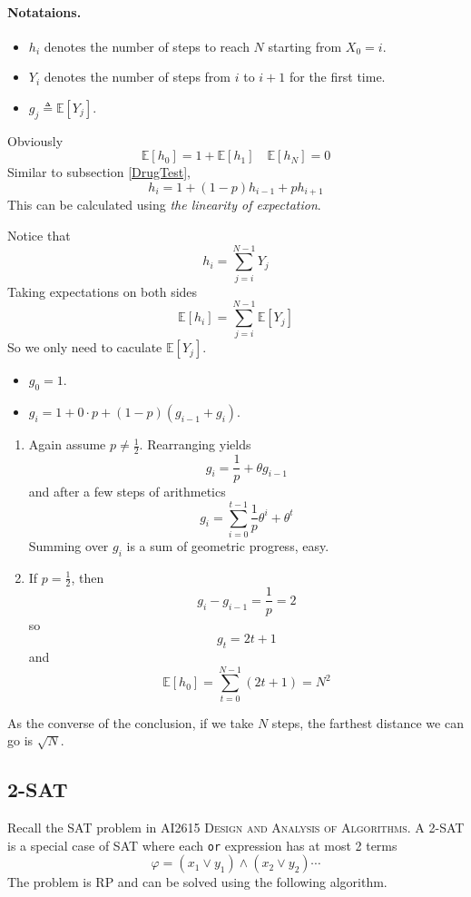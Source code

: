 \paragraph*{Notataions.}
\begin{itemize}
    \item $h_i$ denotes the number of steps to reach $N$ starting from $X_0=i$.
    \item $Y_i$ denotes the number of steps from $i$ to $i+1$ for the first time.
    \item $g_j \triangleq \mathbb{E}[Y_j]$.
\end{itemize}
Obviously
\[ \mathbb{E}[h_0] = 1 + \mathbb{E}[h_1] \quad \mathbb{E}[h_N] = 0 \]
Similar to subsection \ref{DrugTest},
\[ h_i = 1+ (1-p)h_{i-1} + ph_{i+1} \]
This can be calculated using \emph{the linearity of expectation}. 

Notice that
\[ h_i = \sum_{j=i}^{N-1}Y_j \]
Taking expectations on both sides
\[ \mathbb{E}[h_i] = \sum_{j=i}^{N-1}\mathbb{E}[Y_j] \]
So we only need to caculate $\mathbb{E}[Y_j]$.
\begin{itemize}
    \item $g_0 = 1$.
    \item $g_i = 1 + 0 \cdot p + (1-p)(g_{i-1}+g_i)$.
\end{itemize}
\begin{enumerate}
    \item Again assume $p \neq \frac{1}{2}$. 
    Rearranging yields
    \[ g_i = \frac{1}{p} + \theta g_{i-1} \]
    and after a few steps of arithmetics
    \[ g_i = \sum_{i=0}^{t-1}\frac{1}{p}\theta^i + \theta^t \]
    Summing over $g_i$ is a sum of geometric progress, easy.
    \item If $p = \frac{1}{2}$, then
    \[ g_{i} - g_{i-1} = \frac{1}{p} = 2 \]
    so
    \[ g_t = 2t + 1 \]
    and
    \[ \mathbb{E}[h_0] = \sum_{t=0}^{N-1}(2t+1) = N^2 \]
\end{enumerate}
\begin{remark}
    As the converse of the conclusion, if we take $N$ steps, the farthest distance we can go is $\sqrt{N}$.
\end{remark}

\subsection{2-SAT}
Recall the SAT problem in \textsc{AI2615 Design and Analysis of Algorithms}. A 2-SAT is a special case of SAT where each \verb|or| expression has at most 2 terms
\[ \varphi = (x_1 \vee y_1) \wedge (x_2 \vee y_2) \cdots \]
The problem is RP and can be solved using the following algorithm.


